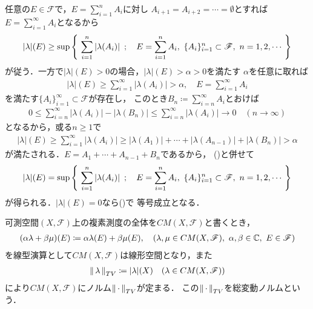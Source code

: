 	\begin{prf}
		任意の$E \in \mathscr{F}$で，$E = \sum_{i=1}^n A_i$に対し
		$A_{i+1} = A_{i+2} = \cdots = \emptyset$とすれば
		$E = \sum_{i=1}^\infty A_i$となるから
		\begin{align}
			|\lambda|(E) \geq \operatorname*{sup}_{} \left\{\ \sum_{i=1}^n|\lambda(A_i)|\ \, ; \quad E=\sum_{i=1}^n A_i,
			\ \{A_i\}_{i=1}^n \subset \mathscr{F},\ n=1,2,\cdots\ \right\}
			\label{eq:thm_complex_measure_finite_splits}
		\end{align}
		が従う．一方で$|\lambda|(E) > 0$の場合，$|\lambda|(E) > \alpha > 0$を満たす
		$\alpha$を任意に取れば
		\begin{align}
			|\lambda|(E) \geq \sum_{i=1}^\infty |\lambda(A_i)| > \alpha,
			\quad E = \sum_{i=1}^\infty A_i
		\end{align}
		を満たす$\{A_i\}_{i=1}^\infty \subset \mathscr{F}$が存在し，
		このとき$B_n \coloneqq \sum_{i=n}^\infty A_i$とおけば
		\begin{align}
			0 \leq \sum_{i=n}^\infty |\lambda(A_i)| - \left| \lambda\left(B_n\right) \right|
			\leq \sum_{i=n}^\infty |\lambda(A_i)| \longrightarrow 0
			\quad (n \longrightarrow \infty)
		\end{align}
		となるから，或る$n \geq 1$で
		\begin{align}
			|\lambda|(E) \geq \sum_{i=1}^\infty |\lambda(A_i)| 
			\geq |\lambda(A_1)| + \cdots + |\lambda(A_{n-1})| + \left| \lambda\left(B_n\right) \right|> \alpha
		\end{align}
		が満たされる．$E = A_1 + \cdots + A_{n-1} + B_n$であるから，
		()と併せて
		\begin{align}
			|\lambda|(E) = \operatorname*{sup}_{} \left\{\ \sum_{i=1}^n|\lambda(A_i)|\ \, ; \quad E=\sum_{i=1}^n A_i,
			\ \{A_i\}_{i=1}^n \subset \mathscr{F},\ n=1,2,\cdots\ \right\}
		\end{align}
		が得られる．$|\lambda|(E) = 0$なら()で
		等号成立となる．
		\QED
	\end{prf}
	
	\begin{screen}
		\begin{thm}[総変動ノルム]
			可測空間$(X,\mathscr{F})$上の複素測度の全体を$CM(X,\mathscr{F})$と書くとき，
			\begin{align}
				(\alpha \lambda + \beta \mu)(E) \coloneqq \alpha \lambda(E) + \beta \mu(E),
				\quad (\lambda,\mu \in CM(X,\mathscr{F}),\ \alpha,\beta \in \mathbb{C},\ E \in \mathscr{F})
				\label{complex_measure_linear}
			\end{align}
			を線型演算として$CM(X,\mathscr{F})$は線形空間となり，また
			\begin{align}
				\left\|\, \lambda\, \right\|_{TV} \coloneqq |\lambda|(X) \quad (\lambda \in CM(X,\mathscr{F}))
			\end{align}
			により$CM(X,\mathscr{F})$にノルム$\left\|\, \cdot\, \right\|_{TV}$が定まる．
			この$\left\|\, \cdot\, \right\|_{TV}$を総変動ノルムという．
		\end{thm}
	\end{screen}
	
